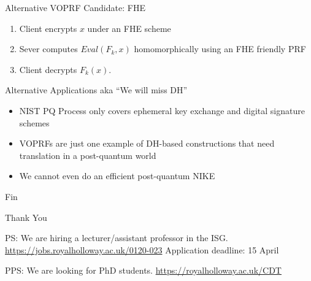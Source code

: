 \documentclass[xcolor=table,10pt,aspectratio=169]{beamer}
\begin{document}
\begin{frame}[label={sec:org0156a7a}]{Alternative VOPRF Candidate: FHE}
\begin{enumerate}
\item Client encrypts \(x\) under an FHE scheme
\item Sever computes \(Eval(F_k, x)\) homomorphically using an FHE friendly PRF 
\item Client decrypts \(F_k(x)\).
\end{enumerate}
\end{frame}

\begin{frame}[label={sec:org7b8b6ca}]{Alternative Applications aka “We will miss DH”}
\begin{itemize}
\item NIST PQ {\color{lightgray}{Competition} }Process only covers ephemeral key exchange and digital signature schemes
\item VOPRFs are just one example of DH-based constructions that need translation in a post-quantum world
\item We cannot even do an efficient post-quantum NIKE
\end{itemize}
\end{frame}

\begin{frame}[label={sec:org866bc91},standout]{Fin}
\begin{center}
\Huge \alert{Thank You}
\end{center}

PS: We are hiring a lecturer/assistant professor in the ISG. \url{https://jobs.royalholloway.ac.uk/0120-023} Application deadline: 15 April

PPS: We are looking for PhD students. \url{https://royalholloway.ac.uk/CDT}
\end{frame}
\end{document}
